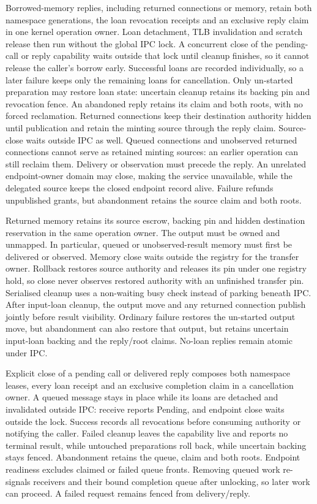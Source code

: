 Borrowed-memory replies, including returned connections or memory, retain both
namespace generations, the loan revocation receipts
and an exclusive reply claim in one kernel operation owner. Loan detachment,
TLB invalidation and scratch release then run without the global IPC lock.
A concurrent close of the pending-call or reply capability waits outside that
lock until cleanup finishes, so it cannot release the caller's borrow early.
Successful loans are recorded individually, so a later failure keeps only the
remaining loans for cancellation. Only un-started preparation may restore loan
state: uncertain cleanup retains its backing pin and revocation fence. An
abandoned reply retains its claim and both roots, with no forced reclamation.
Returned connections keep their destination authority hidden until publication
and retain the minting source through the reply claim. Source-close waits
outside IPC as well. Queued connections and unobserved returned connections
cannot serve as retained minting sources: an earlier operation can still reclaim
them. Delivery or observation must precede the reply. An unrelated endpoint-owner
domain may close, making the service unavailable, while the delegated source
keeps the closed endpoint record alive. Failure refunds unpublished grants, but
abandonment retains the source claim and both roots.

Returned memory retains its source escrow, backing pin and hidden destination
reservation in the same operation owner. The output must be owned and unmapped. In particular,
queued or unobserved-result memory must first be delivered or observed. Memory
close waits outside the registry for the transfer owner. Rollback restores source
authority and releases its pin under one registry hold, so close never observes
restored authority with an unfinished transfer pin. Serialised cleanup uses a
non-waiting busy check instead of parking beneath IPC. After input-loan cleanup,
the output move and any returned connection publish jointly before result
visibility. Ordinary failure restores the un-started output move, but abandonment
can also restore that output, but retains uncertain input-loan backing and the
reply/root claims. No-loan replies remain atomic under IPC.

Explicit close of a pending call or delivered reply composes both namespace
leases, every loan receipt and an exclusive completion claim in a cancellation
owner. A queued message stays in place while its loans are detached and
invalidated outside IPC: receive reports Pending, and endpoint close waits
outside the lock. Success records all revocations before consuming authority
or notifying the caller. Failed cleanup leaves the capability live and reports
no terminal result, while untouched preparations roll back, while uncertain backing
stays fenced. Abandonment retains the queue, claim and both roots.
Endpoint readiness excludes claimed or failed queue fronts. Removing queued
work re-signals receivers and their bound completion queue after unlocking,
so later work can proceed. A failed request remains fenced from delivery/reply.

